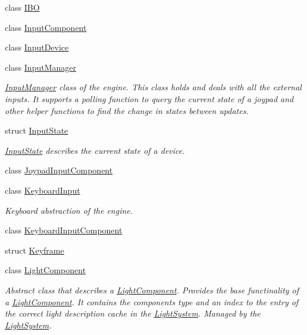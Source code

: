 \begin{DoxyCompactItemize}
\item 
class \hyperlink{class_blade_1_1_i_b_o}{I\+BO}
\item 
class \hyperlink{class_blade_1_1_input_component}{Input\+Component}
\item 
class \hyperlink{class_blade_1_1_input_device}{Input\+Device}
\item 
class \hyperlink{class_blade_1_1_input_manager}{Input\+Manager}
\begin{DoxyCompactList}\small\item\em \hyperlink{class_blade_1_1_input_manager}{Input\+Manager} class of the engine. This class holds and deals with all the external inputs. It supports a polling function to query the current state of a joypad and other helper functions to find the change in states between updates. \end{DoxyCompactList}\item 
struct \hyperlink{struct_blade_1_1_input_state}{Input\+State}
\begin{DoxyCompactList}\small\item\em \hyperlink{struct_blade_1_1_input_state}{Input\+State} describes the current state of a device. \end{DoxyCompactList}\item 
class \hyperlink{class_blade_1_1_joypad_input_component}{Joypad\+Input\+Component}
\item 
class \hyperlink{class_blade_1_1_keyboard_input}{Keyboard\+Input}
\begin{DoxyCompactList}\small\item\em Keyboard abstraction of the engine. \end{DoxyCompactList}\item 
class \hyperlink{class_blade_1_1_keyboard_input_component}{Keyboard\+Input\+Component}
\item 
struct \hyperlink{struct_blade_1_1_keyframe}{Keyframe}
\item 
class \hyperlink{class_blade_1_1_light_component}{Light\+Component}
\begin{DoxyCompactList}\small\item\em Abstract class that describes a \hyperlink{class_blade_1_1_light_component}{Light\+Component}. Provides the base functinality of a \hyperlink{class_blade_1_1_light_component}{Light\+Component}. It contains the component\textquotesingle{}s type and an index to the entry of the correct light description cache in the \hyperlink{class_blade_1_1_light_system}{Light\+System}. Managed by the \hyperlink{class_blade_1_1_light_system}{Light\+System}. \end{DoxyCompactList}\item 

\end{DoxyCompactItemize}
